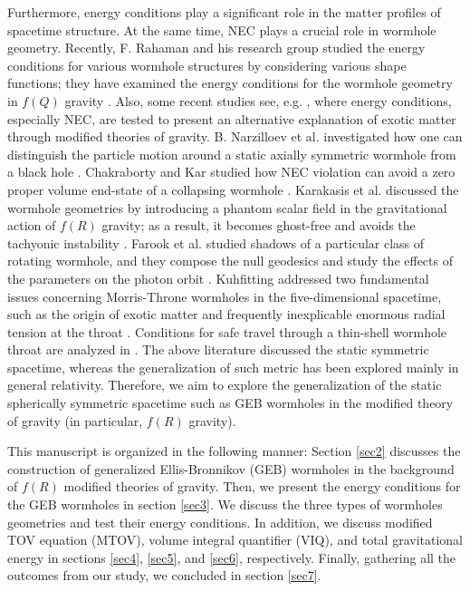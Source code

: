 Furthermore, energy conditions play a significant role in the matter profiles of spacetime structure. At the same time, NEC plays a crucial role in wormhole geometry. Recently, F. Rahaman and his research group studied the energy conditions for various wormhole structures by considering various shape functions; they have examined the energy conditions for the wormhole geometry in $f(Q)$ gravity \cite{ref61a}. Also, some recent studies see, e.g. \cite{ref61b}, where energy conditions, especially NEC, are tested to present an alternative explanation of exotic matter through modified theories of gravity. B. Narzilloev et al. investigated how one can distinguish the particle motion around a static axially symmetric wormhole from a black hole \cite{ref61c}. Chakraborty and Kar studied how NEC violation can avoid a zero proper volume end-state of a collapsing wormhole \cite{ref61d}. Karakasis et al. discussed the wormhole geometries by introducing a phantom scalar field in the gravitational action of $f(R)$ gravity; as a result, it becomes ghost-free and avoids the tachyonic instability \cite{ref61e}. Farook et al. studied shadows of a particular class of rotating wormhole, and they compose the null geodesics and study the effects of the parameters on the photon orbit \cite{ref61f}. Kuhfitting addressed two fundamental issues concerning Morris-Throne wormholes in the five-dimensional spacetime, such as the origin of exotic matter and frequently inexplicable enormous radial tension at the throat \cite{ref61g}. Conditions for safe travel through a thin-shell wormhole throat are analyzed in \cite{ref61h}. The above literature discussed the static symmetric spacetime, whereas the generalization of such metric has been explored mainly in general relativity. Therefore, we aim to explore the generalization of the static spherically symmetric spacetime such as GEB wormholes in the modified theory of gravity (in particular, $f(R)$ gravity).

This manuscript is organized in the following manner: Section \ref{sec2} discusses the construction of generalized Ellis-Bronnikov (GEB) wormholes in the background of $f(R)$ modified theories of gravity. Then, we present the energy conditions for the GEB wormholes in section \ref{sec3}. We discuss the three types of wormholes geometries and test their energy conditions. In addition, we discuss modified TOV equation (MTOV), volume integral quantifier (VIQ), and total gravitational energy in sections \ref{sec4}, \ref{sec5}, and \ref{sec6}, respectively. Finally, gathering all the outcomes from our study, we concluded in section \ref{sec7}.



